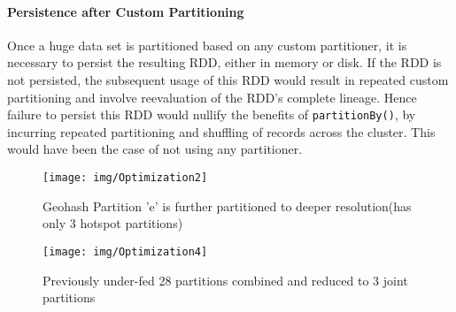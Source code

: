 \documentclass[article,type=msc,colorback,12pt,accentcolor=tud1d]{tudthesis}
\begin{document}
			\paragraph{Persistence after Custom Partitioning}		
			Once a huge data set is partitioned based on any custom partitioner, it is necessary to persist the resulting RDD, either in memory or disk. If the RDD is not persisted, the subsequent usage of this RDD would result in repeated custom partitioning and involve reevaluation of the RDD's complete lineage. Hence failure to persist this RDD would nullify the benefits of \texttt{partitionBy()}, by incurring repeated partitioning and shuffling of records across the cluster. This would have been the case of not using any partitioner. \cite{sparkbook}
			
			\clearpage	
						
			\begin{figure}[p]
			\centering
			\texttt{[image: img/Optimization2]}
			\caption{Geohash Partition 'e' is further partitioned to deeper resolution(has only 3 hotspot partitions)}
			\label{fig:Optimization2}
			\end{figure}
						
						
			\begin{figure}[p]
			\centering
			\texttt{[image: img/Optimization4]}
			\caption{Previously under-fed 28 partitions combined and reduced to 3 joint partitions}
			\label{fig:Optimization4}
			\end{figure}
			
			
			\clearpage
\end{document}

